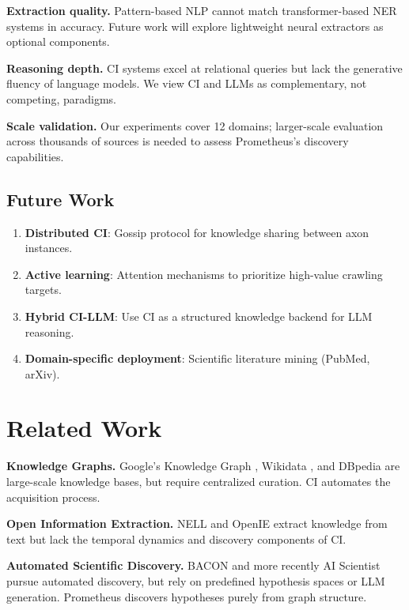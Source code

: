 \documentclass[11pt,twocolumn]{article}
\begin{document}
\textbf{Extraction quality.} Pattern-based NLP cannot match transformer-based NER systems in accuracy. Future work will explore lightweight neural extractors as optional components.

\textbf{Reasoning depth.} CI systems excel at relational queries but lack the generative fluency of language models. We view CI and LLMs as complementary, not competing, paradigms.

\textbf{Scale validation.} Our experiments cover 12 domains; larger-scale evaluation across thousands of sources is needed to assess Prometheus's discovery capabilities.

\subsection{Future Work}

\begin{enumerate}
  \item \textbf{Distributed CI}: Gossip protocol for knowledge sharing between axon instances.
  \item \textbf{Active learning}: Attention mechanisms to prioritize high-value crawling targets.
  \item \textbf{Hybrid CI-LLM}: Use CI as a structured knowledge backend for LLM reasoning.
  \item \textbf{Domain-specific deployment}: Scientific literature mining (PubMed, arXiv).
\end{enumerate}

\section{Related Work}
\label{sec:related}

\textbf{Knowledge Graphs.} Google's Knowledge Graph \citep{singhal2012knowledge}, Wikidata \citep{vrandecic2014wikidata}, and DBpedia \citep{auer2007dbpedia} are large-scale knowledge bases, but require centralized curation. CI automates the acquisition process.

\textbf{Open Information Extraction.} NELL \citep{carlson2010toward} and OpenIE \citep{banko2007open} extract knowledge from text but lack the temporal dynamics and discovery components of CI.

\textbf{Automated Scientific Discovery.} BACON \citep{langley1987scientific} and more recently AI Scientist \citep{lu2024aiscientist} pursue automated discovery, but rely on predefined hypothesis spaces or LLM generation. Prometheus discovers hypotheses purely from graph structure.
\end{document}
